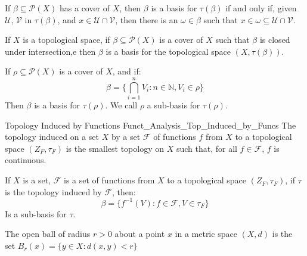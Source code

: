         \begin{theorem}
            If $\beta\subseteq\mathcal{P}(X)$ has a cover of
            $X$, then $\beta$ is a basis for
            $\tau(\beta)$ if and only if, given $\mathcal{U}$,
            $\mathcal{V}$ in $\tau(\beta)$, and
            $x\in\mathcal{U}\cap\mathcal{V}$, then there is an
            $\omega\in\beta$ such that
            $x\in\omega\subseteq\mathcal{U}\cap\mathcal{V}$.
        \end{theorem}
        \begin{theorem}
            If $X$ is a topological space, if
            $\beta\subseteq\mathcal{P}(X)$ is a cover of $X$
            such that $\beta$ is closed under intersection,e
            then $\beta$ is a basis for the topological space
            $(X,\tau(\beta))$.
        \end{theorem}
        \begin{theorem}
            If $\rho\subseteq\mathcal{P}(X)$ is a cover of
            $X$, and if:
            \begin{equation}
                \beta=\Big\{\bigcap_{i=1}^{n}V_{i}:
                    n\in\mathbb{N},V_{i}\in\rho\Big\}
            \end{equation}
            Then $\beta$ is a basis for $\tau(\rho)$. We call
            $\rho$ a sub-basis for $\tau(\rho)$.
        \end{theorem}
        \begin{ldefinition}{Topology Induced by Functions}
              {Funct_Analysis_Top_Induced_by_Funcs}
            The topology induced on a set $X$ by a
            set $\mathcal{F}$ of functions $f$ from $X$ to
            a topological space $(Z_{F},\tau_{F})$ is the
            smallest topology on $X$ such that, for all
            $f\in\mathcal{F}$, $f$ is continuous.
        \end{ldefinition}
        \begin{theorem}
            If $X$ is a set, $\mathcal{F}$ is a set of functions
            from $X$ to a topological space $(Z_{F},\tau_{F})$,
            if $\tau$ is the topology induced by $\mathcal{F}$,
            then:
            \begin{equation}
                \beta=\big\{f^{\minus{1}}(V):
                    f\in\mathcal{F},V\in\tau_{F}\big\}
            \end{equation}
            Is a sub-basis for $\tau$.
        \end{theorem}
    \begin{definition}
        The open ball of radius $r>0$
        about a point $x$ in a metric space
        $(X,d)$ is the set
        $B_{r}(x)=\{y\in{X}:d(x,y)<r\}$
    \end{definition}
